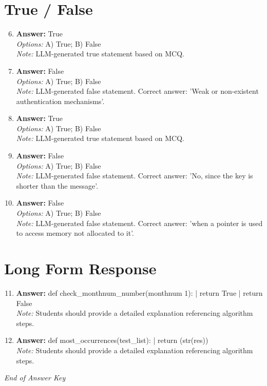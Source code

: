 \documentclass[12pt]{article}
\begin{document}
\section*{True / False}
\begin{enumerate}[label=\arabic*.]
\setcounter{enumi}{5}
\item \textbf{Answer:} True
\\ \textit{Options:} A) True; B) False
\\ \textit{Note:} LLM-generated true statement based on MCQ.
\item \textbf{Answer:} False
\\ \textit{Options:} A) True; B) False
\\ \textit{Note:} LLM-generated false statement. Correct answer: 'Weak or non-existent authentication mechanisms'.
\item \textbf{Answer:} True
\\ \textit{Options:} A) True; B) False
\\ \textit{Note:} LLM-generated true statement based on MCQ.
\item \textbf{Answer:} False
\\ \textit{Options:} A) True; B) False
\\ \textit{Note:} LLM-generated false statement. Correct answer: 'No, since the key is shorter than the message'.
\item \textbf{Answer:} False
\\ \textit{Options:} A) True; B) False
\\ \textit{Note:} LLM-generated false statement. Correct answer: 'when a pointer is used to access memory not allocated to it'.
\end{enumerate}

\section*{Long Form Response}
\begin{enumerate}[label=\arabic*.]
\setcounter{enumi}{10}
\item \textbf{Answer:} def check\_monthnum\_number(monthnum 1): | return True | return False
\\ \textit{Note:} Students should provide a detailed explanation referencing algorithm steps.
\item \textbf{Answer:} def most\_occurrences(test\_list): | return (str(res))
\\ \textit{Note:} Students should provide a detailed explanation referencing algorithm steps.
\end{enumerate}

\vfill
\noindent\textit{End of Answer Key}
\end{document}
